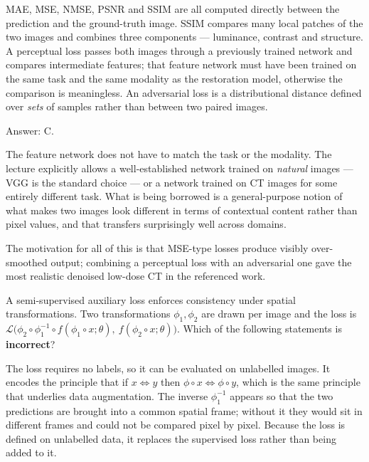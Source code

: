 \documentclass[11pt]{exam}
\begin{document}
\begin{questions}
\begin{choices}
  \choice MAE, MSE, NMSE, PSNR and SSIM are all computed directly between the prediction and the
  ground-truth image.
  \choice SSIM compares many local patches of the two images and combines three components ---
  luminance, contrast and structure.
  \choice A perceptual loss passes both images through a previously trained network and compares
  intermediate features; that feature network must have been trained on the same task and the same
  modality as the restoration model, otherwise the comparison is meaningless.
  \choice An adversarial loss is a distributional distance defined over \emph{sets} of samples
  rather than between two paired images.
\end{choices}

\begin{solution}
  Answer: C.

  The feature network does not have to match the task or the modality. The lecture explicitly allows
  a well-established network trained on \emph{natural} images --- VGG is the standard choice --- or a
  network trained on CT images for some entirely different task. What is being borrowed is a
  general-purpose notion of what makes two images look different in terms of contextual content
  rather than pixel values, and that transfers surprisingly well across domains.

  The motivation for all of this is that MSE-type losses produce visibly over-smoothed output;
  combining a perceptual loss with an adversarial one gave the most realistic denoised low-dose CT
  in the referenced work.
\end{solution}

\question
A semi-supervised auxiliary loss enforces consistency under spatial transformations. Two
transformations $\phi_1, \phi_2$ are drawn per image and the loss is
$\mathcal{L}\big(\phi_2 \circ \phi_1^{-1} \circ f(\phi_1 \circ x;\theta),\ f(\phi_2 \circ x;\theta)
\big)$. Which of the following statements is \textbf{incorrect}?

\begin{choices}
  \choice The loss requires no labels, so it can be evaluated on unlabelled images.
  \choice It encodes the principle that if $x \Leftrightarrow y$ then $\phi \circ x \Leftrightarrow
  \phi \circ y$, which is the same principle that underlies data augmentation.
  \choice The inverse $\phi_1^{-1}$ appears so that the two predictions are brought into a common
  spatial frame; without it they would sit in different frames and could not be compared pixel by
  pixel.
  \choice Because the loss is defined on unlabelled data, it replaces the supervised loss rather
  than being added to it.
\end{choices}


\end{questions}
\end{document}
